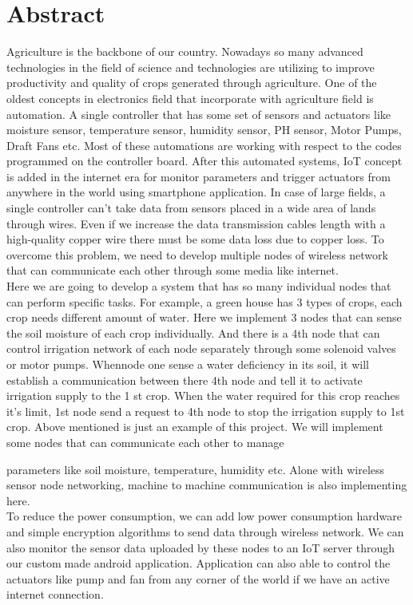 \chapter*{Abstract}%
%

 
Agriculture is the backbone of our country. Nowadays so many advanced technologies
in the field of science and technologies are utilizing to improve productivity and quality
of crops generated through agriculture. One of the oldest concepts in electronics field
that incorporate with agriculture field is automation. A single controller that has some
set of sensors and actuators like moisture sensor, temperature sensor, humidity sensor,
PH sensor, Motor Pumps, Draft Fans etc. Most of these automations are working
with respect to the codes programmed on the controller board. After this automated
systems, IoT concept is added in the internet era for monitor parameters and trigger
actuators from anywhere in the world using smartphone application.
In case of large fields, a single controller can’t take data from sensors placed in a wide
area of lands through wires. Even if we increase the data transmission cables length
with a high-quality copper wire there must be some data loss due to copper loss. To
overcome this problem, we need to develop multiple nodes of wireless network that
can communicate each other through some media like internet.\\
Here we are going to develop a system that has so many individual nodes that can
perform specific tasks. For example, a green house has 3 types of crops, each crop
needs different amount of water. Here we implement 3 nodes that can sense the soil
moisture of each crop individually. And there is a 4th node that can control irrigation
network of each node separately through some solenoid valves or motor pumps. Whennode one sense a water deficiency in its soil, it will establish a communication between
there 4th node and tell it to activate irrigation supply to the 1 st crop. When the
water required for this crop reaches it’s limit, 1st node send a request to 4th node
to stop the irrigation supply to 1st crop. Above mentioned is just an example of this
project. We will implement some nodes that can communicate each other to manage

parameters like soil moisture, temperature, humidity etc. Alone with wireless sensor
node networking, machine to machine communication is also implementing here. \\To
reduce the power consumption, we can add low power consumption hardware and
simple encryption algorithms to send data through wireless network. We can also
monitor the sensor data uploaded by these nodes to an IoT server through our custommade android application. Application can also able to control the actuators like pump
and fan from any corner of the world if we have an active internet connection.